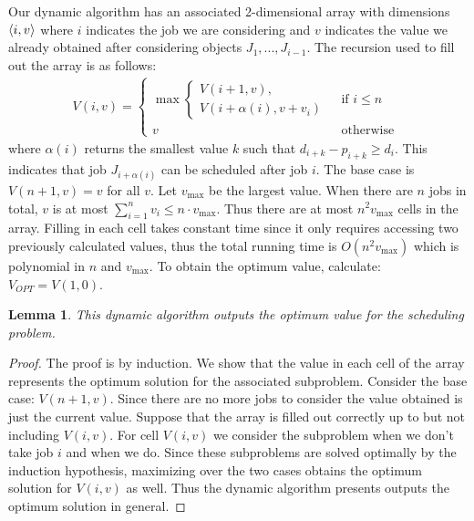 \documentclass[11pt]{article}
\newtheorem{lemma}[theorem]{Lemma}
\DeclarePairedDelimiter\anglebrac{\langle}{\rangle}
\begin{document}
Our dynamic algorithm has an associated 2-dimensional array with dimensions $\anglebrac{i, v}$ where $i$ indicates the job we are considering and $v$ indicates the value we already obtained after considering objects $J_1, ..., J_{i-1}$. The recursion used to fill out the array is as follows:
\begin{align*}
V(i, v) = 
\begin{cases}
\max \begin{cases}
V(i+1, v),\\
V(i+\alpha(i), v+v_i)
\end{cases}
&\mbox{ if } i \leq n\\
v &\mbox{ otherwise }
\end{cases}
\end{align*}
where $\alpha(i)$ returns the smallest value $k$ such that $d_{i + k} - p_{i+k} \geq d_i$. This indicates that job $J_{i+\alpha(i)}$ can be scheduled after job $i$. The base case is $V(n+1, v) = v$ for all $v$. Let $v_{\max}$ be the largest value. When there are $n$ jobs in total, $v$ is at most $\sum_{i=1}^{n} v_i \leq n \cdot v_{\max}$. Thus there are at most $n^2v_{\max}$ cells in the array. Filling in each cell takes constant time since it only requires accessing two previously calculated values, thus the total running time is $O(n^2v_{\max})$ which is polynomial in $n$ and $v_{\max}$. To obtain the optimum value, calculate: $V_{OPT} = V(1,0)$.  
\begin{lemma}
This dynamic algorithm outputs the optimum value for the scheduling problem.
\end{lemma}
\begin{proof}
The proof is by induction. We show that the value in each cell of the array represents the optimum solution for the associated subproblem. Consider the base case: $V(n+1, v)$. Since there are no more jobs to consider the value obtained is just the current value. Suppose that the array is filled out correctly up to but not including $V(i, v)$. For cell $V(i,v)$ we consider the subproblem when we don't take job $i$ and when we do. Since these subproblems are solved optimally by the induction hypothesis, maximizing over the two cases obtains the optimum solution for $V(i,v)$ as well. Thus the dynamic algorithm presents outputs the optimum solution in general.
\end{proof}

\end{document}
